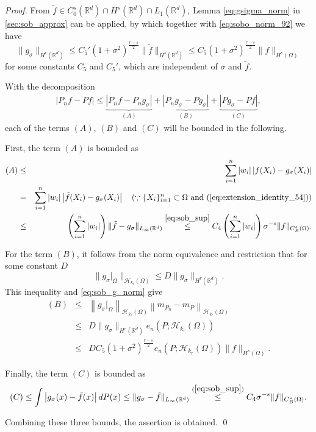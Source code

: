 \documentclass[11pt]{article}
\theoremstyle{remark}
\theoremstyle{example}
\theoremstyle{remark}
\renewcommand{\H}{{\mathcal{H}}}
\newcommand{\tf}{{\tilde{f}}}
\newcommand{\R}{\mathbb{R}}
\begin{document}
\begin{proof}
From $\tf \in C_0^s(\R^d) \cap H^s(\R^d) \cap L_1(\R^d)$, Lemma \ref{eq:gsigma_norm} in \ref{sec:sob_approx} can be applied, by which together with \eqref{eq:sobo_norm_92} we have 
\begin{equation}
\| g_{\sigma} \|_{H^r (\R^d)} 
\leq C_5' (1+\sigma^2)^{\frac{r-s}{2}} \| \tf \|_{H^s (\R^d)}\leq  C_5 (1+\sigma^2)^{\frac{r-s}{2}} \| f \|_{H^s (\Omega)}  \label{eq:sob_g_norm}
\end{equation}
for some constants $C_5$ and $C_5'$, which are independent of $\sigma$ and $\tf$. 

With the decomposition 
\begin{eqnarray*} 
| P_n f - Pf | \leq \underbrace{| P_n f - P_n g_{\sigma} |}_{(A)} +  \underbrace{| P_n g_{\sigma}  -  P g_{\sigma}|}_{(B)} +  \underbrace{| P g_{\sigma}  - P f |}_{(C)},
\end{eqnarray*}
%
each of the terms $(A)$, $(B)$ and $(C)$ will be bounded in the following. 

First, the term $(A)$ is bounded as
\begin{eqnarray*}
(A) 
&\leq &   \sum_{i=1}^n | w_i |  \left| f(X_i) - g_{\sigma}(X_i) \right| \\
&=& \sum_{i=1}^n |w_i| \left| \tf(X_i) - g_{\sigma}(X_i) \right| \quad (\because \{ X_i \}_{i=1}^n \subset \Omega \ {\rm and}\ (\ref{eq:extension_identity_54}) )\\
&\leq& \left( \sum_{i=1}^n |w_i| \right)  \| \tf - g_{\sigma} \|_{L_\infty (\R^d)} 
\stackrel{\eqref{eq:sob_sup}}{\leq} C_4  \left( \sum_{i=1}^n |w_i| \right)  \sigma^{-s} \| f \|_{C_B^s(\Omega)}.%
\end{eqnarray*}

For the term $(B)$, it follows from the norm equivalence and restriction that for some constant $D$
\begin{equation} \label{eq:g_sigma_bound_130}
\| g_{\sigma}|_\Omega \|_{\H_{k_r}(\Omega)} \leq  D \| g_{\sigma} \|_{H^r(\R^d)}.
\end{equation}
This inequality and \eqref{eq:sob_g_norm} give 
\begin{eqnarray*}
(B) &\leq&  \left\|  g_{\sigma} |_{\Omega} \right\|_{ \H_{k_r} (\Omega) }   \left\|  m_{P_n} - m_P \right\|_{ \H_{k_r} (\Omega) }  \\
& \leq & D \| g_{\sigma} \|_{H^r(\R^d)}   e_n(P;\H_{k_r} (\Omega) )  \\ 
&\leq &  D C_5 (1+\sigma^2)^{\frac{r-s}{2}}  e_n(P;\H_{k_r} (\Omega) )  \| f \|_{H^s (\Omega)}.  %
\end{eqnarray*}

Finally, the term $(C)$ is bounded as
\begin{equation*}
(C)
\leq \int \left| g_{\sigma}(x) - \tf(x) \right| dP(x) 
\leq \| g_{\sigma} - \tf \|_{L_\infty(\R^d)} 
\stackrel{(\ref{eq:sob_sup})}{\leq} C_4 \sigma^{-s} \| f \|_{C_B^s(\Omega)}.%
\end{equation*}

Combining these three bounds, the assertion is obtained.  \qed
\end{proof}
\end{document}

